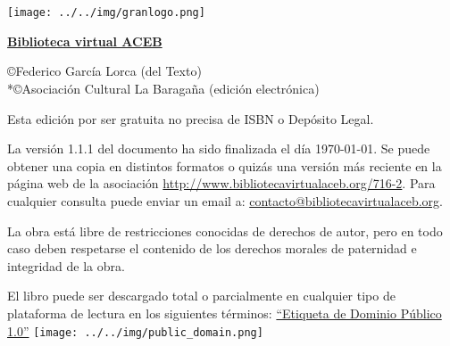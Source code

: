 \documentclass[
    a5paper,
    DIV=10,
    12pt,
    notitlepage,
    oneside,]
{scrbook} %
\begin{document}
\newlength{\saveleftmargini} %
\setlength{\saveleftmargini}{\leftmargini} %
\setlength{\leftmargini}{0.5em} %

\thispagestyle{empty} %




\thispagestyle{empty} %

\section*{} %
\vspace{2em}
\begin{center}
\texttt{[image: ../../img/granlogo.png]}

\href{http://www.bibliotecavirtualaceb.org}{\textbf{Biblioteca virtual ACEB}}

\end{center}

\vfill
\copyright Federico García Lorca (del Texto)\\*\copyright Asociación Cultural La Baragaña (edición electrónica)

Esta edición por ser gratuita no precisa de ISBN o Depósito Legal. 

La versión 1.1.1 del documento ha sido finalizada el día \today. Se puede obtener una copia en distintos formatos o quizás una versión más
reciente en la página web de la asociación \href{http://www.bibliotecavirtualaceb.org/716-2}{http://www.bibliotecavirtualaceb.org/716-2}.
Para cualquier consulta puede enviar un email a: \href{mailto://contacto@bibliotecavirtualaceb.org}{contacto@bibliotecavirtualaceb.org}.

La obra está libre de restricciones conocidas de derechos de autor, pero en todo caso deben respetarse el contenido de los derechos morales de paternidad e integridad de la obra. 

El libro puede ser descargado total o parcialmente en cualquier tipo de plataforma de lectura en los siguientes términos: 
\href{https://creativecommons.org/publicdomain/mark/1.0/}{“Etiqueta de Dominio Público 1.0”}
\texttt{[image: ../../img/public\_domain.png]}
\label{fig:public_domain}
\end{document}
